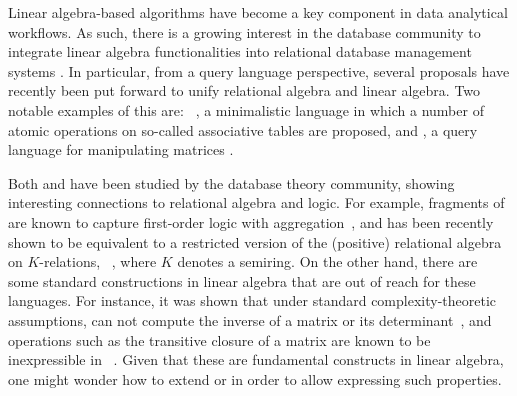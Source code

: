 Linear algebra-based algorithms have become a key component in data analytical workflows. As such, there is a growing interest in the database community to integrate linear algebra functionalities into relational database management systems \cite{Jermaine/17/LAonRA,2019Boehm,LARA_Berlin_2016,JankovLYCZJG19,Khamis0NOS18}. In particular, from a query language perspective, several proposals have recently been put forward to unify relational algebra and linear algebra. Two notable examples of this are: \lara~\cite{HutchisonHS17}, a minimalistic language in which a number of atomic operations on so-called associative tables are proposed, and \lang, a query language for manipulating matrices \cite{matlang-journal}.

Both \lara and \lang have been studied by the database theory community, showing interesting connections to relational algebra and logic. For example, fragments of \lara are known to capture first-order logic with aggregation~\cite{BarceloH0S20}, and \lang has been recently shown to be equivalent to a restricted version of the (positive) relational algebra on $K$-relations, \rak~\cite{brijder2019matrices}, where $K$ denotes a semiring. On the other hand, there are some standard constructions in linear algebra that are out of reach for these languages. For instance, it was shown that under standard complexity-theoretic assumptions, \lara can not compute the inverse of a matrix or its determinant~\cite{BarceloH0S20}, and operations such as the transitive closure of a matrix are known to be inexpressible in \lang~\cite{matlang-journal}. Given that these are fundamental constructs in linear algebra, one might wonder how to extend \lara or \lang in order to allow expressing such properties.

